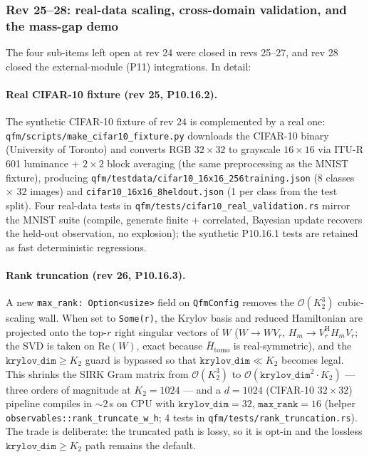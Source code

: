 \documentclass[11pt, a4paper]{article}
\begin{document}
\subsubsection*{Rev 25--28: real-data scaling, cross-domain validation, and
the mass-gap demo}

The four sub-items left open at rev 24 were closed in revs 25--27, and
rev 28 closed the external-module (P11) integrations. In detail:

\paragraph{Real CIFAR-10 fixture (rev 25, P10.16.2).} The synthetic
CIFAR-10 fixture of rev 24 is complemented by a real one:
\texttt{qfm/scripts/make\_cifar10\_fixture.py} downloads the CIFAR-10
binary (University of Toronto) and converts RGB $32\times 32$ to grayscale
$16\times 16$ via ITU-R 601 luminance + $2\times 2$ block averaging (the
same preprocessing as the MNIST fixture), producing
\texttt{qfm/testdata/cifar10\_16x16\_256training.json} (8 classes
$\times$ 32 images) and \texttt{cifar10\_16x16\_8heldout.json} (1 per
class from the test split). Four real-data tests in
\texttt{qfm/tests/cifar10\_real\_validation.rs} mirror the MNIST suite
(compile, generate finite $+$ correlated, Bayesian update recovers the
held-out observation, no explosion); the synthetic P10.16.1 tests are
retained as fast deterministic regressions.

\paragraph{Rank truncation (rev 26, P10.16.3).} A new
\texttt{max\_rank: Option<usize>} field on \texttt{QfmConfig}
removes the $\mathcal{O}(K_2^3)$ cubic-scaling wall. When set to
\texttt{Some(r)}, the Krylov basis and reduced Hamiltonian are projected
onto the top-$r$ right singular vectors of $W$ ($W\to W V_r$,
$H_m\to V_r^{\mathrm{H}} H_m V_r$; the SVD is taken on
$\mathrm{Re}(W)$, exact because $\bar H_{\mathrm{tomo}}$ is
real-symmetric), and the $\texttt{krylov\_dim}\ge K_2$ guard is bypassed
so that $\texttt{krylov\_dim}\ll K_2$ becomes legal. This shrinks the
SIRK Gram matrix from $\mathcal{O}(K_2^3)$ to
$\mathcal{O}(\texttt{krylov\_dim}^2\cdot K_2)$ --- three orders of
magnitude at $K_2=1024$ --- and a $d=1024$ (CIFAR-10 $32\times 32$)
pipeline compiles in $\sim$2\,s on CPU with $\texttt{krylov\_dim}=32$,
$\texttt{max\_rank}=16$ (helper
\texttt{observables::rank\_truncate\_w\_h}; 4 tests in
\texttt{qfm/tests/rank\_truncation.rs}). The trade is deliberate: the
truncated path is lossy, so it is opt-in and the lossless
$\texttt{krylov\_dim}\ge K_2$ path remains the default.
\end{document}
